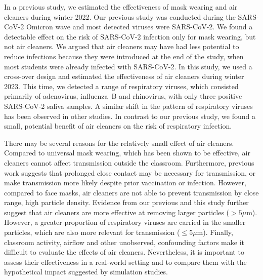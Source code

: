 \documentclass[fleqn,11pt]{wlscirep}
\begin{document}
In a previous study\cite{Banholzer2023PLoSMed}, we estimated the effectiveness of mask wearing and air cleaners during winter 2022. Our previous study was conducted during the SARS-CoV-2 Omicron wave and most detected viruses were SARS-CoV-2. We found a detectable effect on the risk of SARS-CoV-2 infection only for mask wearing, but not air cleaners. We argued that air cleaners may have had less potential to reduce infections because they were introduced at the end of the study, when most students were already infected with SARS-CoV-2. In this study, we used a cross-over design and estimated the effectiveness of air cleaners during winter 2023. This time, we detected a range of respiratory viruses, which consisted primarily of adenovirus, influenza~B and rhinovirus, with only three positive SARS-CoV-2 saliva samples. A similar shift in the pattern of respiratory viruses has been observed in other studies\cite{Nygaard2023Lancet,Sauteur2022EuroSurv}. In contrast to our previous study, we found a small, potential benefit of air cleaners on the risk of respiratory infection. 


There may be several reasons for the relatively small effect of air cleaners. Compared to \eg universal mask wearing, which has been shown to be effective\cite{Banholzer2023PLoSMed,Heinsohn2022,Gettings2021,Leung2020NatMed,Milton2013PLoSPathogens}, air cleaners cannot affect transmission outside the classroom. Furthermore, previous work suggests that prolonged close contact may be necessary for transmission\cite{Leung2020NatMed,Brankston2007LancetID}, or make transmission more likely despite prior vaccination or infection\cite{Lind2023NatCommun}. However, compared to face masks, air cleaners are not able to prevent transmission by close range, high particle density. Evidence from our previous\cite{Banholzer2023PLoSMed} and this study further suggest that air cleaners are more effective at removing larger particles ($>5\mu$m). However, a greater proportion of respiratory viruses are carried in the smaller particles, which are also more relevant for transmission ($\leq5\mu$m)\cite{Fennelly2020}. Finally, classroom activity, airflow and other unobserved, confounding factors make it difficult to evaluate the effects of air cleaners. Nevertheless, it is important to assess their effectiveness in a real-world setting and to compare them with the hypothetical impact suggested by simulation studies\cite{Lindsley2021,Cortellessa2023Build}.
\end{document}
